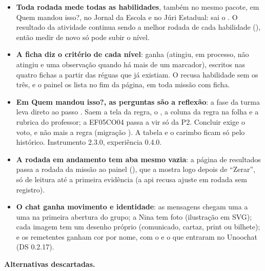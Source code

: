 \begin{itemize}
  \item \textbf{Toda rodada mede todas as habilidades}, também no mesmo pacote,
    em Quem mandou isso?, no Jornal da Escola e no Júri Estadual: sai o
    . O resultado da atividade continua
    sendo a melhor rodada de cada habilidade (), então medir de
    novo só pode subir o nível.
  \item \textbf{A ficha diz o critério de cada nível}: 
    ganha  (atingiu, em processo, não atingiu e uma observação
    quando há mais de um marcador), escritos nas quatro fichas a partir das
    réguas que já existiam. O  recusa habilidade sem os três,
    e o painel os lista no fim da página, em toda missão com ficha.
  \item \textbf{Em Quem mandou isso?, as perguntas são a reflexão}: a fase
     da turma leva direto ao passo . Saem a tela
    da regra, o , a coluna da regra na
    folha e a rubrica do professor; a EF05CO04 passa a vir só da P2. Concluir
    exige o voto, e não mais a regra (migração
    ). A tabela
     e o carimbo  ficam só pelo
    histórico. Instrumento 2.3.0, experiência 0.4.0.
  \item \textbf{A rodada em andamento tem aba mesmo vazia}: a página de
    resultados passa a rodada da missão ao painel (), que
    a mostra logo depois de \enquote{Zerar}, só de leitura até a primeira
    evidência (a api recusa ajuste em rodada sem registro).
  \item \textbf{O chat ganha movimento e identidade}: as mensagens chegam uma a
    uma na primeira abertura do grupo; a Nina tem foto (ilustração em SVG); cada
    imagem tem um desenho próprio (comunicado, cartaz, print ou bilhete); e os
    remetentes ganham cor por nome, com o  e o
     que entraram no Unoochat (DS 0.2.17).
\end{itemize}

\textbf{Alternativas descartadas.}

